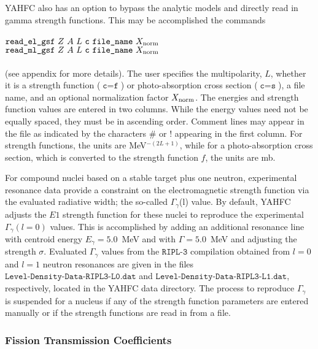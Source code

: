 \documentclass[
10pt,
showpacs,preprintnumbers,footinbib,
amsfonts,amsmath,amssymb,
aps,
prc,twocolumn,groupedaddress,superscriptaddress,
showkeys,
nofootinbib
]{revtex4-1}
\begin{document}
YAHFC also has an option to bypass the analytic models and directly read in gamma strength functions. This may be accomplished the commands\\
\\
${\texttt{read\_el\_gsf}}~Z~A~L~{\texttt{c}}~{\texttt{file\_name}}~X_{\rm norm}$ \\
${\texttt{read\_ml\_gsf}}~Z~A~L~{\texttt{c}}~{\texttt{file\_name}}~X_{\rm norm}$ \\
\\
(see appendix for more details). The user specifies the multipolarity, $L$, whether it is a strength function (${\texttt{c}}={\texttt{f}}$) or 
photo-absorption cross section (${\texttt{c}}={\texttt{s}}$), a file name, and an optional normalization factor $X_{\rm norm}$. The energies and strength function values are entered in two columns. While the energy values need not be equally spaced, they must be in ascending order. Comment lines may appear in the file as indicated by the characters \# or ! appearing in the first column. For strength functions, the units are MeV$^{-{(2L+1)}}$, while for a photo-absorption cross section, which is converted to the strength function $f$, the units are mb.

For compound nuclei based on a stable target plus one neutron, experimental resonance data provide a constraint on the electromagnetic strength function via the evaluated radiative width; the so-called $\Gamma_\gamma$(l) value. By default, YAHFC adjusts the $E1$ strength function for these nuclei to reproduce the experimental $\Gamma_\gamma(l=0)$ values. This is accomplished by adding an additional resonance line with centroid energy $E_\gamma = 5.0$~MeV and with $\Gamma = 5.0$~MeV and adjusting the strength $\sigma$. Evaluated $\Gamma_\gamma$ values from the ${\texttt{RIPL-3}}$ compilation obtained from $l=0$ and $l=1$ neutron resonances are given in the files ${\texttt{Level-Density-Data-RIPL3-L0.dat}}$ and ${\texttt{Level-Density-Data-RIPL3-L1.dat}}$, respectively, located in the YAHFC data directory. The process to reproduce $\Gamma_\gamma$ is suspended for a nucleus if any of the strength function parameters are entered manually or if the strength functions are read in from a file.

\subsubsection{Fission Transmission Coefficients}
\end{document}
